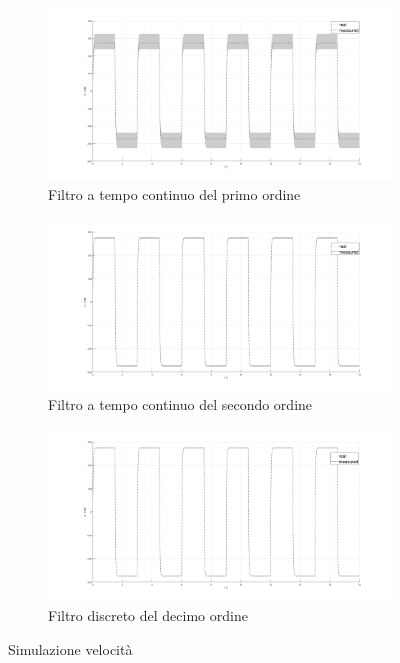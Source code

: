 \documentclass[a4paper, 12pt, Arial]{article}
\begin{document}
\begin{figure}[H]
    \centering
    \begin{subfigure}{0.3\linewidth}
        \centering
        \includegraphics[width=\linewidth]{./Images/speed_filter_1.png}
        \caption{Filtro a tempo continuo del primo ordine}
        \label{Lab5:first}
    \end{subfigure}
    \begin{subfigure}{0.3\linewidth}
        \centering
        \includegraphics[width=\linewidth]{./Images/speed_filter_2.png}
        \caption{Filtro a tempo continuo del secondo ordine}
        \label{Lab5:second}
    \end{subfigure}
    \begin{subfigure}{0.3\linewidth}
        \centering
        \includegraphics[width=\linewidth]{./Images/speed_filter_3.png}
        \caption{Filtro discreto del decimo ordine}
        \label{Lab5:discrete}
    \end{subfigure}
    \caption{Simulazione velocità}
\end{figure}
\end{document}
